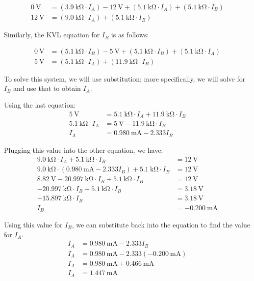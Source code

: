 \documentclass{article}
\begin{document}
\begin{align*}
    \SI{0}{\volt} &= (\SI{3.9}{\kilo\ohm}\cdot I_A) - \SI{12}{\volt} + (\SI{5.1}{\kilo\ohm}\cdot I_A) + ( \SI{5.1}{\kilo\ohm}\cdot I_B )\\
    \SI{12}{\volt} &= (\SI{9.0}{\kilo\ohm}\cdot I_A) + (\SI{5.1}{\kilo\ohm}\cdot I_B)
\end{align*}

Similarly, the KVL equation for \(I_B\) is as follows:

\begin{align*}
    \SI{0}{\volt} &= ( \SI{5.1}{\kilo\ohm}\cdot I_B ) - \SI{5}{\volt} + ( \SI{5.1}{\kilo\ohm} \cdot I_B ) + (\SI{5.1}{\kilo\ohm} \cdot I_A)\\
    \SI{5}{\volt} &= ( \SI{5.1}{\kilo\ohm}\cdot I_A ) + (\SI{11.9}{\kilo\ohm}\cdot I_B)
\end{align*}

To solve this system, we will use substitution; more
specifically, we will solve for \(I_B\) and use that to obtain \(I_A\).

Using the last equation:
\begin{align*}
    \SI{5}{\volt} &=  \SI{5.1}{\kilo\ohm}\cdot I_A  + \SI{11.9}{\kilo\ohm}\cdot I_B\\
    \SI{5.1}{\kilo\ohm}\cdot I_A &= \SI{5}{\volt} - \SI{11.9}{\kilo\ohm}\cdot I_B\\
    I_A &= \SI{0.980}{\milli\ampere} - 2.333I_B
\end{align*}

Plugging this value into the other equation, we have:
\begin{align*}
    \SI{9.0}{\kilo\ohm}\cdot I_A + \SI{5.1}{\kilo\ohm}\cdot I_B &= \SI{12}{\volt}\\
    \SI{9.0}{\kilo\ohm}\cdot (\SI{0.980}{\milli\ampere} - 2.333I_B) + \SI{5.1}{\kilo\ohm}\cdot I_B &= \SI{12}{\volt}\\
    \SI{8.82}{\volt} - \SI{20.997}{\kilo\ohm}\cdot I_B + \SI{5.1}{\kilo\ohm}\cdot I_B &= \SI{12}{\volt}\\
    \SI{-20.997}{\kilo\ohm}\cdot I_B + \SI{5.1}{\kilo\ohm}\cdot I_B &= \SI{3.18}{\volt}\\
    \SI{-15.897}{\kilo\ohm}\cdot I_B &= \SI{3.18}{\volt}\\
    I_B &= \SI{-0.200}{\milli\ampere}
\end{align*}

Using this value for \(I_B\), we can substitute back into the
equation to find the value for \(I_A\).
\begin{align*}
    I_A &= \SI{0.980}{\milli\ampere} - 2.333I_B\\
    I_A &= \SI{0.980}{\milli\ampere} - 2.333(\SI{-0.200}{\milli\ampere})\\
    I_A &= \SI{0.980}{\milli\ampere} + \SI{0.466}{\milli\ampere}\\
    I_A &= \SI{1.447}{\milli\ampere}
\end{align*}
\end{document}
